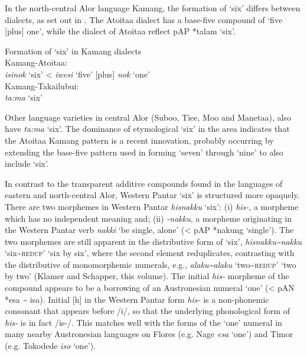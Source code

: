 \documentclass[output=paper]{LSP/langsci}
\begin{document}
In the north-central Alor language Kamang, the formation of `six' differs between dialects, as set out in . The Atoitaa dialect has a base-five compound of `five [plus] one', while the dialect of Atoitaa reflect p\textsc{AP} *talam `six'. 



\ea%
\label{ex:6:5}
Formation of `six' in Kamang dialects\\
 Kamang{}-Atoitaa: \\
\textit{isi}\textit{{\ng}}\textit{nok}\textbf{} `six'     {\textless} \textit{iwesi}\textit{{\ng}} `five' [plus] \textit{nok} `one'\\
    Kamang{}-Takailubui:\\
    \textit{ta:ma} `six'      \\ 
\z





Other language varieties in central Alor (Suboo, Tiee, Moo and Manetaa), also have \textit{ta:ma} `six'. The dominance of etymological `six' in the area indicates that the Atoitaa Kamang pattern is a recent innovation, probably occurring by extending the base-five pattern used in forming `seven' through `nine' to also include `six'. 

In contrast to the transparent additive compounds found in the languages of eastern and north-central Alor, Western Pantar `six' is structured more opaquely. There are two morphemes in Western Pantar \textit{hisnakku}\textit{{\ng}} `six': (i) \textit{his-}, a morpheme which has no independent meaning and; (ii) \textit{{}-nakku}\textit{{\ng}}, a morpheme originating in the Western Pantar verb \textit{nakki}\textit{{\ng}} `be single, alone' ({\textless} pAP *nakung `single'). The two morphemes are still apparent in the distributive form of `six', \textit{hisnakku}\textit{{\ng}}\textit{\~{}nakku}\textit{{\ng}} `six\~{}\textsc{redup}' `six by six', where the second element reduplicates, contrasting with the distributive of monomorphemic numerals, e.g., \textit{alaku\~{}alaku} `two\~{}\textsc{redup}' `two by two' (Klamer and Schapper, this volume). The initial \textit{his-} morpheme of the compound appears to be a borrowing of an Austronesian numeral `one' ({\textless} pAN *esa \~{} isa). Initial [h] in the Western Pantar form \textit{his-} is a non-phonemic consonant that appears before /i/, so that the underlying phonological form of \textit{his-} is in fact /is-/. This matches well with the forms of the `one' numeral in many nearby Austronesian languages on Flores (e.g. Nage \textit{esa} `one') and Timor (e.g. Tokodede \textit{iso} `one'). 
\end{document}
